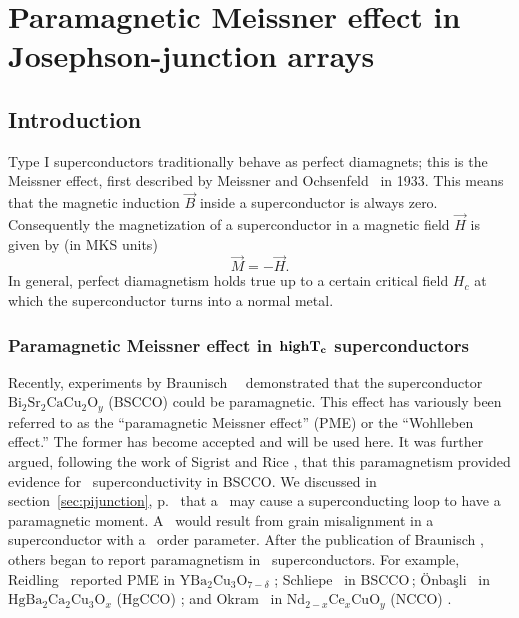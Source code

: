 
\chapter{Paramagnetic Meissner effect in Josephson-junction arrays}
\label{chap:pme_experiment}

\section{Introduction}
\label{sec:pme_exp_intro}

Type I superconductors traditionally behave as perfect diamagnets; this is
the Meissner
effect, first described by Meissner and Ochsenfeld
\cite{meissner_dn_21_787_1933}\ in 1933. This means that the magnetic
induction $\vec{B}$ inside a superconductor is always zero. Consequently the
magnetization of a superconductor in a magnetic field $\vec{H}$ is given by
(in MKS units)
\begin{equation}
\vec{M} = -  \vec{H}.
\end{equation} 
In general, perfect diamagnetism 
holds true up to a certain critical field $H_{c}$ 
at which the superconductor turns into a normal metal. 

\subsection[Paramagnetic Meissner effect in \hightc\ superconductors]
{Paramagnetic Meissner effect in $\mathbf{high T_c}$ superconductors}

Recently, experiments by Braunisch \etal\ 
\cite{braunisch_prl_68_1908_1992,braunisch_prb_48_4030_1993}\
demonstrated that 
the superconductor
$\mathrm{Bi}_2\mathrm{Sr}_2\mathrm{CaCu}_2\mathrm{O}_y$
(BSCCO) could be paramagnetic. 
\index{Wohlleben effect}
This effect has variously been referred to as the ``paramagnetic Meissner
effect'' (PME)%
\glossary{PME} or the ``Wohlleben effect.'' The former has become 
accepted and will
be used here. 
It was
further argued, following the work of Sigrist and Rice
\cite{sigrist_jpsj_61_4283_1992,sigrist_rmp_503_67_1995},
that this paramagnetism provided 
evidence for \dwave\ superconductivity in BSCCO.
\index{\pijunction}%
We discussed in section~\ref{sec:pijunction}, p.~\pageref{sec:pijunction}
that a \pijunction\ may cause a superconducting loop
to have a paramagnetic moment. A \pijunction\ would result from 
grain misalignment in a superconductor with a \dwave\ order
parameter.
After the publication
of Braunisch \etal, others began to report paramagnetism in 
\hightc\ superconductors. For example, Reidling \etal\ reported PME in 
$\mathrm{Y}\mathrm{Ba}_2\mathrm{Cu}_3\mathrm{O}_{7-\delta}$
\cite{riedling_prb_49_13283_1994}; Schliepe \etal\ in 
BSCCO\,\cite{schliepe_prb_47_8331_1993}; \"{O}nba\c{s}li \etal\ in 
$\mathrm{Hg}\mathrm{Ba}_2\mathrm{Ca}_2\mathrm{Cu}_3\mathrm{O}_x$ (HgCCO)
\cite{onbasli_pssb_194_371_1996}; and Okram \etal\  in
$\mathrm{Nd}_{2-x}\mathrm{Ce}_x\mathrm{Cu}\mathrm{O}_y$   (NCCO)
\cite{okram_jpcm_9_L525_1997}. 


